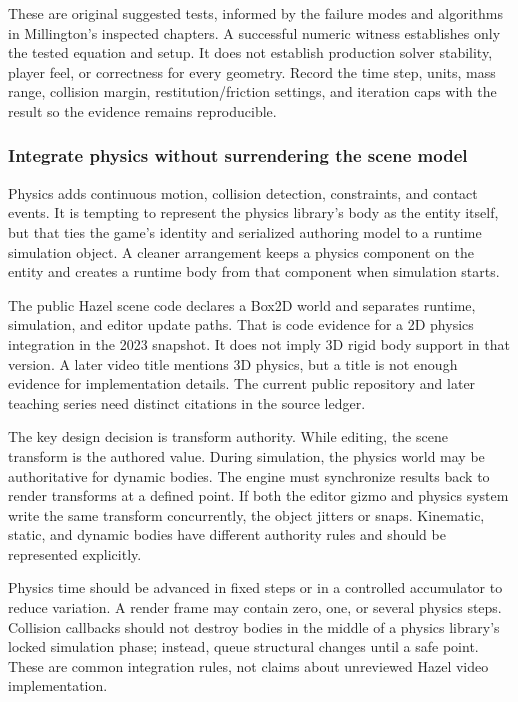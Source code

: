 These are original suggested tests, informed by the failure modes and algorithms in Millington's inspected chapters. A successful numeric witness establishes only the tested equation and setup. It does not establish production solver stability, player feel, or correctness for every geometry. Record the time step, units, mass range, collision margin, restitution/friction settings, and iteration caps with the result so the evidence remains reproducible.

\subsubsection{Integrate physics without surrendering the scene model}\label{06-engine-ii-ch033-integrate-physics-without-surrendering-the-scene-model}

Physics adds continuous motion, collision detection, constraints, and contact events. It is tempting to represent the physics library's body as the entity itself, but that ties the game's identity and serialized authoring model to a runtime simulation object. A cleaner arrangement keeps a physics component on the entity and creates a runtime body from that component when simulation starts.

The public Hazel scene code declares a Box2D world and separates runtime, simulation, and editor update paths. That is code evidence for a 2D physics integration in the 2023 snapshot. It does not imply 3D rigid body support in that version. A later video title mentions 3D physics, but a title is not enough evidence for implementation details. The current public repository and later teaching series need distinct citations in the source ledger.

The key design decision is transform authority. While editing, the scene transform is the authored value. During simulation, the physics world may be authoritative for dynamic bodies. The engine must synchronize results back to render transforms at a defined point. If both the editor gizmo and physics system write the same transform concurrently, the object jitters or snaps. Kinematic, static, and dynamic bodies have different authority rules and should be represented explicitly.

Physics time should be advanced in fixed steps or in a controlled accumulator to reduce variation. A render frame may contain zero, one, or several physics steps. Collision callbacks should not destroy bodies in the middle of a physics library's locked simulation phase; instead, queue structural changes until a safe point. These are common integration rules, not claims about unreviewed Hazel video implementation.

